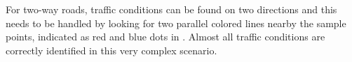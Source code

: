 %
%
%
%
%



For two-way roads, traffic conditions can be found on two directions
and this needs to be handled by looking for two parallel colored lines
nearby the sample points, indicated as red and blue dots in 
.  Almost all traffic conditions are correctly
identified in this very complex scenario.

